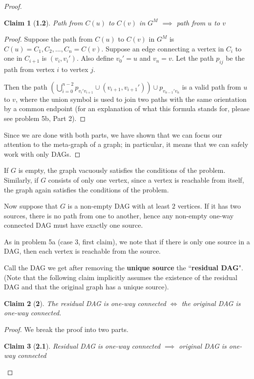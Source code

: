 \documentclass[answers]{exam}
\newtheorem*{claim}{Claim}
\begin{document}
\begin{questions}
\begin{solution}
\begin{proof}
\begin{claim}[\textbf{1.2}] Path from $C(u)$ to $C(v)$ in $G^M$ $\implies$ path from $u$ to $v$
\end{claim}
\begin{proof} Suppose the path from $C(u)$ to $C(v)$ in $G^M$ is $C(u) = C_1, C_2, ..., C_n = C(v)$. Suppose an edge connecting a vertex in $C_i$ to one in $C_{i + 1}$ is $(v_i, v_i')$. Also define $v_0' = u$ and $v_n = v$. 
Let the path $p_{ij}$ be the path from vertex $i$ to vertex $j$.

Then the path $\left(\bigcup_{i = 0}^{n - 2} p_{v_i'v_{i + 1}}\cup (v_{i + 1}, v_{i + 1}')\right) \cup p_{v_{n - 1}'v_{n}}$ is a valid path from $u$ to $v$, where the union symbol is used to join two paths with the same orientation by a common endpoint (for an explanation of what this formula stands for, please see problem 5b, Part 2).
\end{proof}
Since we are done with both parts, we have shown that we can focus our attention to the meta-graph of a graph; in particular, it means that we can safely work with only DAGs.
\end{proof}

If $G$ is empty, the graph vacuously satisfies the conditions of the problem.
Similarly, if $G$ consists of only one vertex, since a vertex is reachable from itself, the graph again satisfies the conditions of the problem.

Now suppose that $G$ is a non-empty DAG with at least $2$ vertices. If it has two sources, there is no path from one to another, hence any non-empty one-way connected DAG must have exactly one source.

As in problem 5a (case 3, first claim), we note that if there is only one source in a DAG, then each vertex is reachable from the source.

Call the DAG we get after removing the \textbf{unique source} the ``\textbf{residual DAG}". (Note that the following claim implicitly assumes the existence of the residual DAG and that the original graph has a unique source).

\begin{claim}[\textbf{2}] The residual DAG is one-way connected $\iff$ the original DAG is one-way connected.
\end{claim}

\begin{proof}

We break the proof into two parts.

\begin{claim}[\textbf{2.1}] Residual DAG is one-way connected $\implies$ original DAG is one-way connected
\end{claim}


\end{proof}
\end{solution}
\end{questions}
\end{document}
